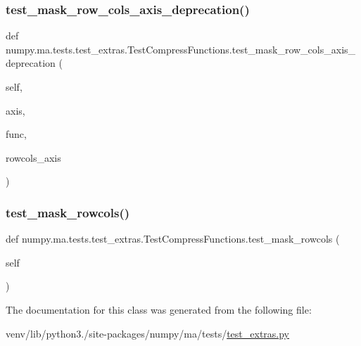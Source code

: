 \subsubsection{\texorpdfstring{test\+\_\+mask\+\_\+row\+\_\+cols\+\_\+axis\+\_\+deprecation()}{test\_mask\_row\_cols\_axis\_deprecation()}}
{\footnotesize\ttfamily def numpy.\+ma.\+tests.\+test\+\_\+extras.\+Test\+Compress\+Functions.\+test\+\_\+mask\+\_\+row\+\_\+cols\+\_\+axis\+\_\+deprecation (\begin{DoxyParamCaption}\item[{}]{self,  }\item[{}]{axis,  }\item[{}]{func,  }\item[{}]{rowcols\+\_\+axis }\end{DoxyParamCaption})}

\mbox{\label{classnumpy_1_1ma_1_1tests_1_1test__extras_1_1TestCompressFunctions_a10b70c86d4fe26bef0dafdae581a50d4}} 
\subsubsection{\texorpdfstring{test\+\_\+mask\+\_\+rowcols()}{test\_mask\_rowcols()}}
{\footnotesize\ttfamily def numpy.\+ma.\+tests.\+test\+\_\+extras.\+Test\+Compress\+Functions.\+test\+\_\+mask\+\_\+rowcols (\begin{DoxyParamCaption}\item[{}]{self }\end{DoxyParamCaption})}



The documentation for this class was generated from the following file\+:\begin{DoxyCompactItemize}
\item 
venv/lib/python3./site-\/packages/numpy/ma/tests/\hyperlink{test__extras_8py}{test\+\_\+extras.\+py}\end{DoxyCompactItemize}
